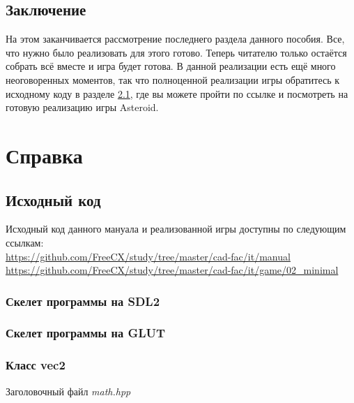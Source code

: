 \section{Заключение}
На этом заканчивается рассмотрение последнего раздела данного пособия. Все, что нужно 
было реализовать для этого готово. Теперь читателю только остаётся собрать всё вместе и 
игра будет готова. В данной реализации есть ещё много неоговоренных моментов, так что 
полноценной реализации игры обратитесь к исходному коду в разделе \ref{source:code}, 
где вы можете пройти по ссылке и посмотреть на готовую реализацию игры Asteroid.

\chapter{Справка}

\section{Исходный код}
\label{source:code}
Исходный код данного мануала и реализованной игры доступны по следующим ссылкам:\\
\url{https://github.com/FreeCX/study/tree/master/cad-fac/it/manual}\\
\url{https://github.com/FreeCX/study/tree/master/cad-fac/it/game/02_minimal}

\subsection{Скелет программы на SDL2}
\label{code:skeletonSDL2}


\pagebreak

\subsection{Скелет программы на GLUT}
\label{code:skeletonGLUT}


\pagebreak

\subsection{Класс vec2}
\label{code:vec2}
\begin{center}
    Заголовочный файл \emph{math.hpp}
\end{center}


